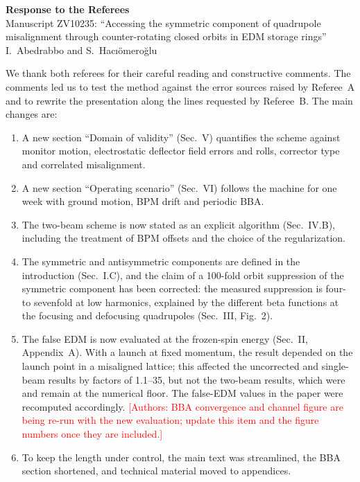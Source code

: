 \documentclass[11pt,a4paper]{article}
\begin{document}
\begin{center}
{\large\bfseries Response to the Referees}\\[3pt]
Manuscript ZV10235: ``Accessing the symmetric component of quadrupole misalignment through
counter-rotating closed orbits in EDM storage rings''\\
I.~Abedrabbo and S.~Hac{\i}\"omero\u{g}lu
\end{center}

We thank both referees for their careful reading and constructive comments. The comments led us to test
the method against the error sources raised by Referee~A and to rewrite the presentation along the lines
requested by Referee~B. The main changes are:
\begin{enumerate}[nosep]
\item A new section ``Domain of validity'' (Sec.~V) quantifies the scheme against monitor motion,
electrostatic deflector field errors and rolls, corrector type and correlated misalignment.
\item A new section ``Operating scenario'' (Sec.~VI) follows the machine for one week with ground motion,
BPM drift and periodic BBA.
\item The two-beam scheme is now stated as an explicit algorithm (Sec.~IV.B), including the treatment of
BPM offsets and the choice of the regularization.
\item The symmetric and antisymmetric components are defined in the introduction (Sec.~I.C), and the claim
of a 100-fold orbit suppression of the symmetric component has been corrected: the measured suppression is
four- to sevenfold at low harmonics, explained by the different beta functions at the focusing and
defocusing quadrupoles (Sec.~III, Fig.~2).
\item The false EDM is now evaluated at the frozen-spin energy (Sec.~II, Appendix~A). With a launch at
fixed momentum, the result depended on the launch point in a misaligned lattice; this affected the
uncorrected and single-beam results by factors of 1.1--35, but not the two-beam results, which were
and remain at the numerical floor. The false-EDM values in the paper were recomputed accordingly.
\textcolor{red}{[Authors: BBA convergence and channel figure are being re-run with the new evaluation;
update this item and the figure numbers once they are included.]}
\item To keep the length under control, the main text was streamlined, the BBA section shortened, and
technical material moved to appendices.
\end{enumerate}
\end{document}

